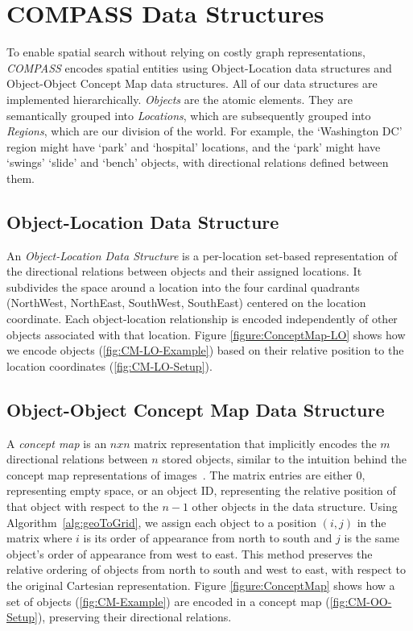 \section{COMPASS Data Structures}
\label{section:data_structures}
To enable spatial search without relying on costly graph representations, \emph{COMPASS} encodes spatial entities using Object-Location data structures and Object-Object Concept Map data structures. 
All of our data structures are implemented hierarchically. \textit{Objects} are the atomic elements. They are semantically grouped into \textit{Locations}, which are subsequently grouped into \textit{Regions}, which are our division of the world. For example, the `Washington DC' region might have `park' and `hospital' locations, and the `park' might have `swings' `slide' and `bench' objects, with directional relations defined between them. 

\subsection{Object-Location Data Structure}
An \textit{Object-Location Data Structure} is a per-location set-based representation of the directional relations between objects and their assigned locations.
It subdivides the space around a location into the four cardinal quadrants (NorthWest, NorthEast, SouthWest, SouthEast) centered on the location coordinate.
Each object-location relationship is encoded independently of other objects associated with that location.
Figure \ref{figure:ConceptMap-LO} shows how we encode objects (\ref{fig:CM-LO-Example}) based on their relative position to the location coordinates (\ref{fig:CM-LO-Setup}).


\subsection{Object-Object Concept Map Data Structure}

A \textit{concept map} is an $nxn$ matrix representation that implicitly encodes the $m$ directional relations between $n$ stored objects, similar to the intuition behind the concept map representations of images~\cite{Xu2010}.
The matrix entries are either $0$, representing empty space, or an object ID, representing the relative position of that object with respect to the $n-1$ other objects in the data structure.
Using Algorithm~\ref{alg:geoToGrid}, we assign each object to a position $(i,j)$ in the matrix where $i$ is its order of appearance from north to south and $j$ is the same object's order of appearance from west to east.
This method preserves the relative ordering of objects from north to south and west to east, with respect to the original Cartesian representation.
Figure \ref{figure:ConceptMap} shows how a set of objects (\ref{fig:CM-Example}) are encoded in a concept map (\ref{fig:CM-OO-Setup}), preserving their directional relations. 


